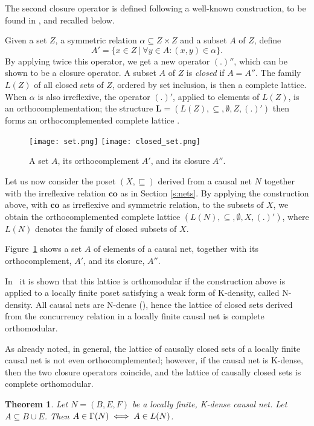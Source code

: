\documentclass{eptcs}
\newcommand{\co}{\mathrel{\mathbf{co}}}
\newtheorem{theorem}{Theorem}
\begin{document}
The second closure operator is defined following a well-known
construction, to be found in \cite{B79}, and recalled below.

Given a set $Z$, a symmetric relation $\alpha \subseteq Z \times Z$
and a subset $A$ of $Z$, define
\begin{displaymath} 
  A'=\{x \in Z \ | \ \forall y \in A: (x,y) \in \alpha\}.
\end{displaymath}
By applying twice this operator,
we get a new operator $(.)''$, which can be shown to be
a closure operator.
A subset $A$ of $Z$ is \emph{closed}  
if $A = A''$. The family $L(Z)$ of all closed sets of $Z$, ordered
by set inclusion, is then a complete lattice.
When $\alpha$ is also irreflexive, 
the operator $(.)'$, applied to elements of $L(Z)$,
is an orthocomplementation; the structure
$\mathbf{L} = (L(Z), \subseteq, \emptyset, Z, (.)')$ 
then forms an orthocomplemented complete lattice \cite{B79}. 
\begin{figure}
  \begin{center}
\texttt{[image: set.png]}
\texttt{[image: closed\_set.png]}
  \end{center}
  \caption{A set $A$, its orthocomplement $A'$,
           and its closure $A''$.}\label{f:setclosure}
\end{figure}
Let us now consider the poset $(X,\sqsubseteq)$ derived from a causal net
$N$ together with the irreflexive relation $\co$ as in Section
\ref{s:nets}. By applying the
construction above, with $\co$ as irreflexive and symmetric
relation, to the subsets of $X$, we
obtain the orthocomplemented complete lattice
$(L(N), \subseteq, \emptyset, X, (.)')$, where $L(N)$ denotes the family
of closed subsets of $X$.

Figure~\ref{f:setclosure} shows a set $A$ of elements of
a causal net, together with its orthocomplement, $A'$,
and its closure, $A''$.

In~\cite{BPR10} it is shown that this lattice is orthomodular if the
construction above is applied to a locally finite poset satisfying
a weak form of
K-density, called N-density. All causal nets are N-dense (\cite{BF88}),
hence the lattice of closed sets derived from the concurrency relation
in a locally finite causal net is complete orthomodular.

As already noted, in general, the lattice of causally closed sets of a locally finite
causal net is not even orthocomplemented; however, if the causal net
is K-dense, then the two closure operators coincide, and the lattice
of causally closed sets is complete orthomodular.
\begin{theorem} \label{t:chiusieCC}\cite{BPR10}
Let $N = (B, E, F)$ be a locally finite, K-dense causal net.
Let  $A \subseteq B \cup E$.
Then $A \in \Gamma(N)  \iff  A \in L(N)$.
\end{theorem}
\end{document}
